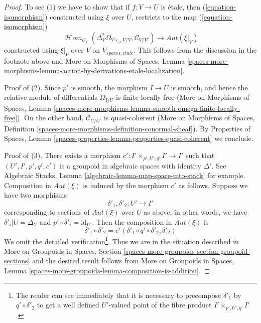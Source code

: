 \documentclass[10pt,a4paper]{amsart}
\theoremstyle{plain}
\theoremstyle{definition}
\theoremstyle{remark}
\numberwithin{equation}{subsection}
\def\SheafHom{\mathop{\mathcal{H}\!\mathit{om}}\nolimits}
\def\etale{{\acute{e}tale}}
\begin{document}
\begin{proof}
\medskip\noindent
To see (1) we have to show that if $f : V \to U$ is \'etale,
then (\ref{equation-isomorphism}) constructed using $\xi$ over $U$,
restricts to the map (\ref{equation-isomorphism})
$$
\SheafHom_{\mathcal{O}_V}(
\Delta_V^*\Omega_{V \times_\mathcal{X} V/V}, \mathcal{C}_{V/V'}) \to
\mathit{Aut}(\xi|_V)
$$
constructed using $\xi|_V$ over $V$ on $V_{spaces, \etale}$.
This follows from the discussion in the footnote above
and More on Morphisms of Spaces, Lemma
\ref{spaces-more-morphisms-lemma-action-by-derivations-etale-localization}.

\medskip\noindent
Proof of (2). Since $p'$ is smooth, the morphism $I \to U$ is smooth,
and hence the relative module of differentials $\Omega_{I/U}$
is finite locally free (More on Morphisms of Spaces, Lemma
\ref{spaces-more-morphisms-lemma-smooth-omega-finite-locally-free}).
On the other hand, $\mathcal{C}_{U/U'}$ is quasi-coherent
(More on Morphisms of Spaces, Definition
\ref{spaces-more-morphisms-definition-conormal-sheaf}).
By Properties of Spaces, Lemma
\ref{spaces-properties-lemma-properties-quasi-coherent}
we conclude.

\medskip\noindent
Proof of (3). There exists a morphism $c' : I' \times_{p', U', q'} I' \to I'$
such that $(U', I', p', q', c')$ is a groupoid in algebraic spaces
with identity $\Delta'$. See
Algebraic Stacks, Lemma \ref{algebraic-lemma-map-space-into-stack} for example.
Composition in $\mathit{Aut}(\xi)$ is induced by the morphism
$c'$ as follows. Suppose we have two morphisms
$$
\delta'_1, \delta'_2 : U' \longrightarrow I'
$$
corresponding to sections of $\mathit{Aut}(\xi)$ over $U$ as above,
in other words, we have $\delta'_i|U = \Delta_U$ and
$p' \circ \delta'_i = \text{id}_{U'}$. Then the composition
in $\mathit{Aut}(\xi)$ is
$$
\delta'_1 \circ \delta'_2 = c'(\delta'_1 \circ q' \circ \delta'_2, \delta'_2)
$$
We omit the detailed verification\footnote{The reader can see immediately
that it is necessary to precompose
$\delta'_1$ by $q' \circ \delta'_2$ to get a well defined $U'$-valued
point of the fibre product $I' \times_{p', U', q'} I'$.}.
Thus we are in the situation described in
More on Groupoids in Spaces, Section
\ref{spaces-more-groupoids-section-groupoid-sections}
and the desired result follows from
More on Groupoids in Spaces, Lemma
\ref{spaces-more-groupoids-lemma-composition-is-addition}.
\end{proof}
\end{document}
